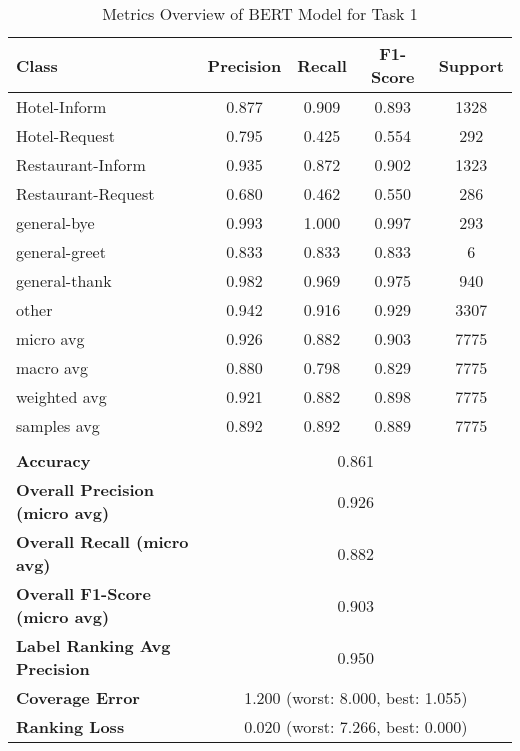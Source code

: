 
\begin{table}[h]
\centering

\begin{tabular}{|l|c|c|c|c|}
\hline
\textbf{Class}& \textbf{Precision} & \textbf{Recall} & \textbf{F1-Score} & \textbf{Support} \\ \hline
Hotel-Inform & 0.877 & 0.909 & 0.893 & 1328 \\ \hline
Hotel-Request & 0.795 & 0.425 & 0.554 & 292 \\ \hline
Restaurant-Inform & 0.935 & 0.872 & 0.902 & 1323 \\ \hline
Restaurant-Request & 0.680 & 0.462 & 0.550 & 286 \\ \hline
general-bye & 0.993 & 1.000 & 0.997 & 293 \\ \hline
general-greet & 0.833 & 0.833 & 0.833 & 6 \\ \hline
general-thank & 0.982 & 0.969 & 0.975 & 940 \\ \hline
other & 0.942 & 0.916 & 0.929 & 3307 \\ \hline\hline
micro avg & 0.926 & 0.882 & 0.903 & 7775 \\ \hline
macro avg & 0.880 & 0.798 & 0.829 & 7775 \\ \hline
weighted avg & 0.921 & 0.882 & 0.898 & 7775 \\ \hline
samples avg & 0.892 & 0.892 & 0.889 & 7775 \\ \hline
\multicolumn{5}{c}{}\\ \hline

\textbf{Accuracy}                    & \multicolumn{4}{c|}{0.861}                                 \\ \hline
\textbf{Overall Precision (micro avg)}           & \multicolumn{4}{c|}{0.926}                                \\ \hline
\textbf{Overall Recall (micro avg)}              & \multicolumn{4}{c|}{0.882}                                   \\ \hline
\textbf{Overall F1-Score (micro avg)}            & \multicolumn{4}{c|}{0.903}                                  \\ \hline
\textbf{Label Ranking Avg Precision} & \multicolumn{4}{c|}{0.950}                                    \\ \hline
\textbf{Coverage Error}              & \multicolumn{4}{c|}{1.200 (worst: 8.000, best: 1.055)}                             \\ \hline
\textbf{Ranking Loss}                & \multicolumn{4}{c|}{0.020 (worst: 7.266, best: 0.000)}                             \\ \hline
\end{tabular}

\caption{Metrics Overview of BERT Model for Task 1}
\label{table:BERT_metrics_task_1}
\end{table}
    